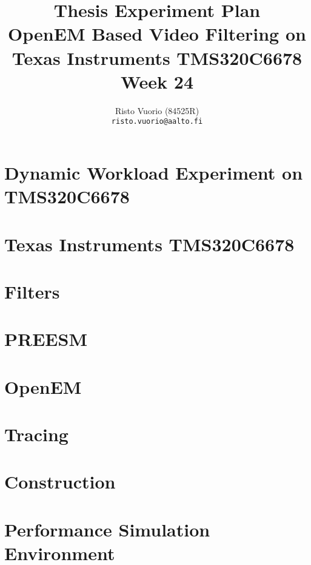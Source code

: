\documentclass[a4paper,10pt]{article}
\title{Thesis Experiment Plan \\
		OpenEM Based Video Filtering on Texas Instruments TMS320C6678 \\
		Week 24}
\author{Risto Vuorio (84525R) \\
		{\tt risto.vuorio@aalto.fi}}
\begin{document}
\maketitle
\newpage
\tableofcontents
\newpage

\section{Dynamic Workload Experiment on TMS320C6678}


\section{Texas Instruments TMS320C6678}


\section{Filters}


\section{PREESM}


\section{OpenEM}


\section{Tracing}


\section{Construction}


\section{Performance Simulation Environment}


%   

%   
\end{document}
